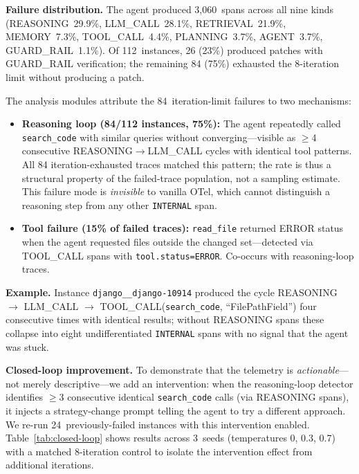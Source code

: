 \documentclass[sigconf,screen]{acmart}
\begin{document}
\textbf{Failure distribution.}
The agent produced 3{,}060~spans across all nine kinds
(REASONING~29.9\%, LLM\_CALL~28.1\%, RETRIEVAL~21.9\%, MEMORY~7.3\%,
TOOL\_CALL~4.4\%, PLANNING~3.7\%, AGENT~3.7\%, GUARD\_RAIL~1.1\%).
Of 112~instances, 26 (23\%) produced patches with GUARD\_RAIL
verification; the remaining 84 (75\%) exhausted the 8-iteration limit
without producing a patch.

The analysis modules attribute the 84~iteration-limit failures to two
mechanisms:

\begin{itemize}[nosep,leftmargin=*]
\item \textbf{Reasoning loop (84/112 instances, 75\%):}
  The agent repeatedly called \texttt{search\_code} with similar queries
  without converging---visible as $\geq$4 consecutive
  REASONING$\to$LLM\_CALL cycles with identical tool patterns.
  All 84 iteration-exhausted traces matched this pattern; the rate is
  thus a structural property of the failed-trace population, not a
  sampling estimate.
  This failure mode is \emph{invisible} to vanilla OTel, which cannot
  distinguish a reasoning step from any other \texttt{INTERNAL} span.
\item \textbf{Tool failure (15\% of failed traces):} \texttt{read\_file}
  returned ERROR status when the agent requested files outside the
  changed set---detected via TOOL\_CALL spans with
  \texttt{tool.status=ERROR}.  Co-occurs with reasoning-loop traces.
\end{itemize}

\textbf{Example.}
Instance \texttt{django\_\_django-10914} produced the cycle
REASONING $\to$ LLM\_CALL $\to$ TOOL\_CALL(\texttt{search\_code},
``FilePathField'') four consecutive times with identical results;
without REASONING spans these collapse into eight undifferentiated
\texttt{INTERNAL} spans with no signal that the agent was stuck.

\textbf{Closed-loop improvement.}
To demonstrate that the telemetry is \emph{actionable}---not merely
descriptive---we add an intervention: when the reasoning-loop detector
identifies $\geq$3 consecutive identical \texttt{search\_code} calls
(via REASONING spans), it injects a strategy-change prompt telling the
agent to try a different approach.  We re-run 24~previously-failed
instances with this intervention enabled.
Table~\ref{tab:closed-loop} shows results across 3~seeds (temperatures
0, 0.3, 0.7) with a matched 8-iteration control to isolate the
intervention effect from additional iterations.
\end{document}
